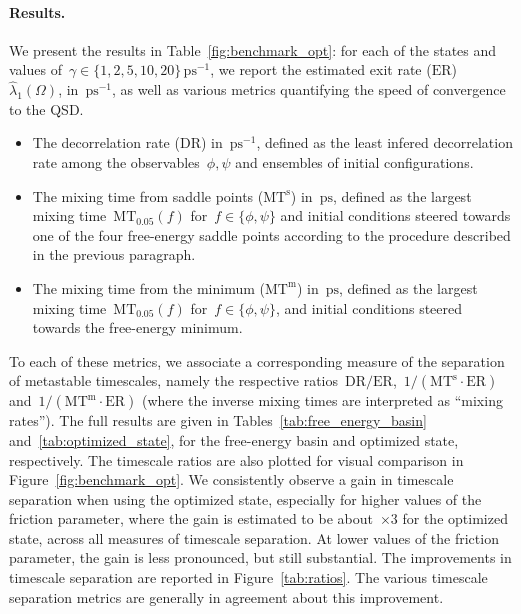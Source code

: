 \documentclass[a4]{article}
\newcommand{\DR}{\mathrm{DR}}
\newcommand{\ER}{\mathrm{ER}}
\newcommand{\MT}{\mathrm{MT}}
\newcommand{\1}{\mathbbm 1}
\begin{document}
\paragraph{Results.}
We present the results in Table~\ref{fig:benchmark_opt}: for each of the states and values of~$\gamma\in\{1,2,5,10,20\}\,\mathrm{ps}^{-1}$, we report the estimated exit rate ($\ER$)~$\widehat{\lambda}_1(\Omega)$, in~$\mathrm{ps}^{-1}$, as well as various metrics quantifying the speed of convergence to the QSD.
\begin{itemize}
    \item{The decorrelation rate ($\DR$) in~$\mathrm{ps}^{-1}$, defined as the least infered decorrelation rate among the observables~$\phi,\psi$ and ensembles of initial configurations.}
    \item{The mixing time from saddle points ($\MT^{\mathrm{s}}$) in~$\mathrm{ps}$, defined as the largest mixing time~$\MT_{0.05}(f)$ for~$f\in\{\phi,\psi\}$ and initial conditions steered towards one of the four free-energy saddle points according to the procedure described in the previous paragraph.}
    \item{The mixing time from the minimum ($\MT^{\mathrm{m}}$) in~$\mathrm{ps}$, defined as the largest mixing time~$\MT_{0.05}(f)$ for~$f\in\{\phi,\psi\}$, and initial conditions steered towards the free-energy minimum.}
\end{itemize}
To each of these metrics, we associate a corresponding measure of the separation of metastable timescales, namely the respective ratios~$\DR/\ER$,~$1/(\MT^{\mathrm{s}}\cdot\ER)$ and~$1/(\MT^{\mathrm{m}}\cdot\ER)$ (where the inverse mixing times are interpreted as ``mixing rates'').
The full results are given in Tables~\ref{tab:free_energy_basin} and~\ref{tab:optimized_state}, for the free-energy basin and optimized state, respectively. The timescale ratios are also plotted for visual comparison in Figure~\ref{fig:benchmark_opt}. We consistently observe a gain in timescale separation when using the optimized state, especially for higher values of the friction parameter, where the gain is estimated to be about~$\times 3$ for the optimized state, across all measures of timescale separation. At lower values of the friction parameter, the gain is less pronounced, but still substantial.
The improvements in timescale separation are reported in Figure~\ref{tab:ratios}. The various timescale separation metrics are generally in agreement about this improvement.
\end{document}
